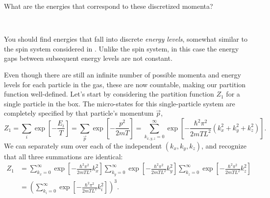 What are the energies that correspond to these discretized momenta?
\begin{mdframed}
  \ \\[60 pt] %
\end{mdframed}
You should find energies that fall into discrete \textit{energy levels}, somewhat similar to the spin system considered in .
Unlike the spin system, in this case the energy gaps between subsequent energy levels are not constant.

Even though there are still an infinite number of possible momenta and energy levels for each particle in the gas, these are now countable, making our partition function well-defined.
Let's start by considering the partition function $Z_1$ for a single particle in the box.
The micro-states for this single-particle system are completely specified by that particle's momentum $\vec p$,
\begin{equation*}
  Z_1 = \sum_i \exp\left[-\frac{E_i}{T}\right] = \sum_{\vec p} \exp\left[-\frac{p^2}{2mT}\right] = \sum_{k_{x, y, z} = 0}^{\infty}\exp\left[-\frac{\hbar^2 \pi^2}{2mTL^2}\left(k_x^2 + k_y^2 + k_z^2\right)\right].
\end{equation*}
We can separately sum over each of the independent $(k_x, k_y, k_z)$, and recognize that all three summations are identical:
\begin{align*}
  Z_1 & = \sum_{k_x = 0}^{\infty} \exp\left[-\frac{\hbar^2 \pi^2}{2mTL^2} k_x^2\right] \sum_{k_y = 0}^{\infty} \exp\left[-\frac{\hbar^2 \pi^2}{2mTL^2} k_y^2\right] \sum_{k_z = 0}^{\infty} \exp\left[-\frac{\hbar^2 \pi^2}{2mTL^2} k_z^2\right] \\
      & = \left(\sum_{k_i = 0}^{\infty} \exp\left[-\frac{\hbar^2 \pi^2}{2mTL^2} k_i^2\right]\right)^3.
\end{align*}

